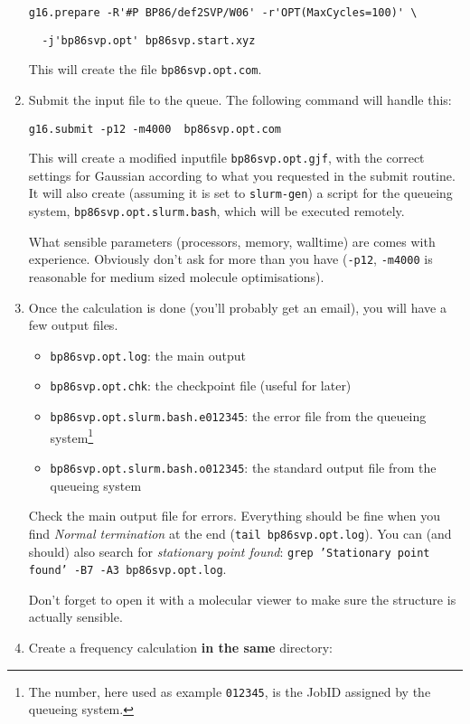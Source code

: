 \documentclass[   %
  final,          %
  a4paper         %
]{article}
\begin{document}
\begin{enumerate}
  \lstinline`g16.prepare -R'#P BP86/def2SVP/W06' -r'OPT(MaxCycles=100)' \`\par
  \lstinline`  -j'bp86svp.opt' bp86svp.start.xyz`

  This will create the file \texttt{bp86svp.opt.com}.

\item
  Submit the input file to the queue. 
  The following command will handle this:

  \lstinline`g16.submit -p12 -m4000  bp86svp.opt.com`

  This will create a modified inputfile \texttt{bp86svp.opt.gjf}, with
  the correct settings for Gaussian according to what you requested in
  the submit routine. It will also create (assuming it is set to
  \texttt{slurm-gen}) a script for the queueing system,
  \texttt{bp86svp.opt.slurm.bash}, which will be executed remotely.

  What sensible parameters (processors, memory, walltime) are comes 
  with experience. Obviously don't ask for more than you have 
  (\lstinline`-p12`, \lstinline`-m4000` is reasonable for medium sized molecule optimisations).
\item
  Once the calculation is done (you'll probably get an email), you will
  have a few output files.

  \begin{itemize}
  \item
    \texttt{bp86svp.opt.log}: the main output
  \item
    \texttt{bp86svp.opt.chk}: the checkpoint file (useful for later)
  \item
    \texttt{bp86svp.opt.slurm.bash.e012345}: the
    error file from the queueing system\footnote{%
      The number, here used as example \texttt{012345}, is the JobID
      assigned by the queueing system.}
  \item
    \texttt{bp86svp.opt.slurm.bash.o012345}: the
    standard output file from the queueing system
  \end{itemize}

  Check the main output file for errors. Everything should be fine when
  you find \emph{Normal termination} at the end (\texttt{tail bp86svp.opt.log}).
  You can (and should) also search for \emph{stationary point found}:\newline
  \texttt{grep 'Stationary point found' -B7 -A3  bp86svp.opt.log}.

  Don't forget to open it with a molecular viewer to make sure the
  structure is actually sensible.
\item
  Create a frequency calculation \textbf{in the same} directory:


\end{enumerate}
\end{document}
